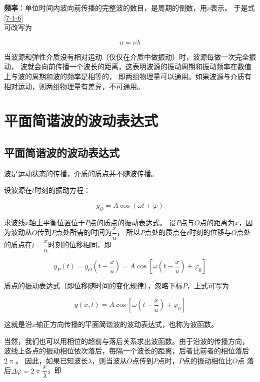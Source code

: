\documentclass[12pt, a4paper]{article}
\numberwithin{equation}{section}
\begin{document}
    \textbf{频率}：单位时间内波向前传播的完整波的数目，是周期的倒数，用\(\nu\)表示。
    于是式\ref{7-1-6}\\可改写为

    \begin{equation}
        u=\nu \lambda
    \end{equation}

    当波源和弹性介质没有相对运动（仅仅在介质中做振动）时，波源每做一次完全振动，
    波就会向前传播一个波长的距离，这表明波源的振动周期和振动频率在数值上与波的周期和波的频率是相等的，
    即两组物理量可以通用。如果波源与介质有相对运动，则两组物理量有差异，不可通用。

\section{平面简谐波的波动表达式}

\subsection{平面简谐波的波动表达式}

    波是运动状态的传播，介质的质点并不随波传播。

    设波源在\(t\)时刻的振动方程：

    $$
        y_O=A \cos (\omega t+\varphi)
    $$

    求波线\(x \)轴上平衡位置位于\(P \)点的质点的振动表达式。
    设\(P \)点与\(O \)点的距离为\(x \)，因为波动从\(O \)传到\(P \)点处所需的时间为\(\dfrac{x }{u }\)，
    所以\(P \)点处的质点在\(t\)时刻的位移与\(O \)点处的质点在\(t - \dfrac{x }{u }\)时刻的位移相同，即

    $$
        y_P(t)=y_O\left(t-\frac{x}{u}\right)=A \cos \left[\omega\left(t-\frac{x}{u}\right)+\varphi_0\right]
    $$

    质点的振动表达式（即位移随时间的变化规律），忽略下标\(P \)，上式可写为

    \begin{equation}
        y(x, t)=A \cos \left[\omega\left(t-\frac{x}{u}\right)+\varphi_0\right]
        \label{7-2-1}
    \end{equation}

    这就是沿\(x\)轴正方向传播的平面简谐波的波动表达式，也称为波函数。
    
    当然，我们也可以用相位的超前与落后关系求出波函数。由于沿波的传播方向，
    波线上各点的振动相位依次落后，每隔一个波长的距离，后者比前者的相位落后\(2 \uppi \)。
    因此，如果已知波长\(\lambda\)，则当波从\(O \)点传到\(P\)点时，\(P \)点的振动相位比\(O\)点
    落后\(\Delta \varphi = 2\uppi \dfrac{x}{\lambda}\)，即
\end{document}
